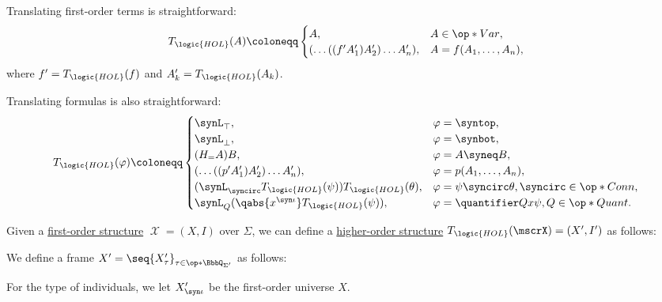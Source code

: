 \begin{algorithm}
\begin{thmenum}
     Translating first-order terms is straightforward:
    \begin{equation*}
      T_{\logic{HOL}}(A) \coloneqq \begin{cases}
        A,                                    &A \in \op*{Var}, \\
        (\ldots ((f' A_1') A_2') \ldots A_n'), &A = f(A_1, \ldots, A_n),
      \end{cases}
    \end{equation*}
    where \( f' = T_{\logic{HOL}}(f) \) and \( A_k' = T_{\logic{HOL}}(A_k) \).

     Translating formulas is also straightforward:
    \begin{equation*}
      T_{\logic{HOL}}(\varphi) \coloneqq \begin{cases}
        \synL_\top,                                                       &\varphi = \syntop, \\
        \synL_\bot,                                                       &\varphi = \synbot, \\
        (H_= A) B,                                                        &\varphi = A \syneq B, \\
        (\ldots ((p' A_1') A_2') \ldots A_n'),                            &\varphi = p(A_1, \ldots, A_n), \\
        (\synL_{\syncirc} T_{\logic{HOL}}(\psi)) T_{\logic{HOL}}(\theta), &\varphi = \psi \syncirc \theta, {\syncirc} \in \op*{Conn}, \\
        \synL_Q (\qabs {x^{\syn\iota}} T_{\logic{HOL}}(\psi)),            &\varphi = \quantifier Q x \psi, Q \in \op*{Quant}. \\
      \end{cases}
    \end{equation*}

     Given a \hyperref[def:fol_structure]{first-order structure} \( \mscrX = (X, I) \) over \( \Sigma \), we can define a \hyperref[def:hol_structure]{higher-order structure} \( T_{\logic{HOL}}(\mscrX) = (X', I') \) as follows:
    \begin{thmenum}
       We define a frame \( X' = \seq{ X'_\tau }_{\tau \in \op*{\BbbQ_{\Sigma'}}} \) as follows:
      \begin{thmenum}
         For the type of individuals, we let \( X'_{\syn\iota} \) be the first-order universe \( X \).


\end{thmenum}
\end{thmenum}
\end{thmenum}
\end{algorithm}
